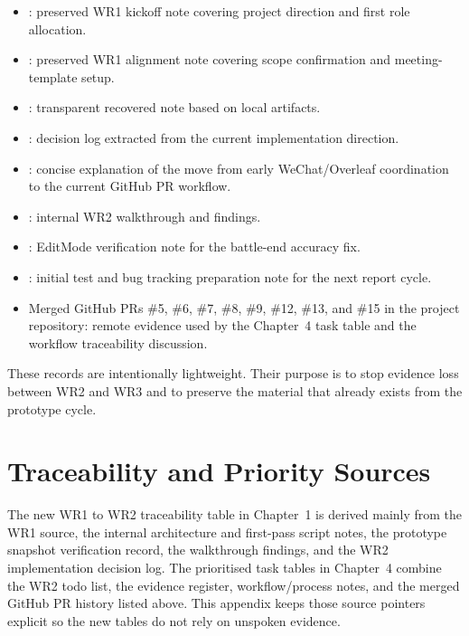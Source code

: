 \begin{itemize}
\item {}: preserved WR1 kickoff note covering project direction and first role allocation.
\item {}: preserved WR1 alignment note covering scope confirmation and meeting-template setup.
\item {}: transparent recovered note based on local artifacts.
\item {}: decision log extracted from the current implementation direction.
\item {}: concise explanation of the move from early WeChat/Overleaf coordination to the current GitHub PR workflow.
\item {}: internal WR2 walkthrough and findings.
\item {}: EditMode verification note for the battle-end accuracy fix.
\item {}: initial test and bug tracking preparation note for the next report cycle.
\item Merged GitHub PRs \#5, \#6, \#7, \#8, \#9, \#12, \#13, and \#15 in the project repository: remote evidence used by the Chapter~4 task table and the workflow traceability discussion.
\end{itemize}
\endgroup

These records are intentionally lightweight. Their purpose is to stop evidence loss between WR2 and WR3 and to preserve the material that already exists from the prototype cycle.

\section{Traceability and Priority Sources}

The new WR1 to WR2 traceability table in Chapter~1 is derived mainly from the WR1 source, the internal architecture and first-pass script notes, the prototype snapshot verification record, the walkthrough findings, and the WR2 implementation decision log. The prioritised task tables in Chapter~4 combine the WR2 todo list, the evidence register, workflow/process notes, and the merged GitHub PR history listed above. This appendix keeps those source pointers explicit so the new tables do not rely on unspoken evidence.

